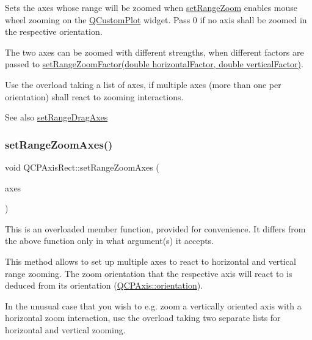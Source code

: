Sets the axes whose range will be zoomed when \hyperlink{class_q_c_p_axis_rect_a7960a9d222f1c31d558b064b60f86a31}{set\+Range\+Zoom} enables mouse wheel zooming on the \hyperlink{class_q_custom_plot}{Q\+Custom\+Plot} widget. Pass 0 if no axis shall be zoomed in the respective orientation.

The two axes can be zoomed with different strengths, when different factors are passed to \hyperlink{class_q_c_p_axis_rect_a895d7ac745ea614e04056244b3c138ac}{set\+Range\+Zoom\+Factor(double horizontal\+Factor, double vertical\+Factor)}.

Use the overload taking a list of axes, if multiple axes (more than one per orientation) shall react to zooming interactions.

\begin{DoxySeeAlso}{See also}
\hyperlink{class_q_c_p_axis_rect_a648cce336bd99daac4a5ca3e5743775d}{set\+Range\+Drag\+Axes} 
\end{DoxySeeAlso}
\mbox{\label{class_q_c_p_axis_rect_a07a41be4eda0d42abe49475e9fa38b92}} 
\subsubsection{\texorpdfstring{set\+Range\+Zoom\+Axes()}{setRangeZoomAxes()}\hspace{0.1cm}{\footnotesize\ttfamily [2/3]}}
{\footnotesize\ttfamily void Q\+C\+P\+Axis\+Rect\+::set\+Range\+Zoom\+Axes (\begin{DoxyParamCaption}\item[{\hyperlink{class_q_list}{Q\+List}$<$ \hyperlink{class_q_c_p_axis}{Q\+C\+P\+Axis} $\ast$$>$}]{axes }\end{DoxyParamCaption})}

This is an overloaded member function, provided for convenience. It differs from the above function only in what argument(s) it accepts.

This method allows to set up multiple axes to react to horizontal and vertical range zooming. The zoom orientation that the respective axis will react to is deduced from its orientation (\hyperlink{class_q_c_p_axis_ab988ef4538e2655bb77bd138189cd42e}{Q\+C\+P\+Axis\+::orientation}).

In the unusual case that you wish to e.\+g. zoom a vertically oriented axis with a horizontal zoom interaction, use the overload taking two separate lists for horizontal and vertical zooming. \mbox{\label{class_q_c_p_axis_rect_ae85a63a856e111def77437812c3acc99}} 
